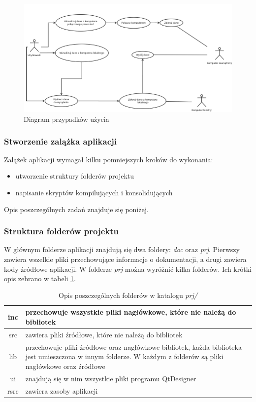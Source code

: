 \documentclass[a4paper]{article}
\begin{document}
\begin{figure}[h]
	\centering
	\includegraphics[width=0.75\paperheight, angle=90]{img/diagramPrzypadkowUzycia.png}
	\caption{Diagram przypadków użycia}
	\label{diagram_przypadkow_uzycia}
\end{figure}

\subsubsection{Stworzenie zalążka aplikacji}

Zalążek aplikacji wymagał kilku pomniejszych kroków do wykonania:
\begin{itemize}
	\item utworzenie struktury folderów projektu
	\item napisanie skryptów kompilujących i konsolidujących
\end{itemize}
Opis poszczególnych zadań znajduje się poniżej.

\subsubsection{Struktura folderów projektu}
W głównym folderze aplikacji znajdują się dwa foldery: \textit{doc} oraz \textit{prj}. Pierwszy zawiera wszelkie pliki przechowujące informacje o dokumentacji, a drugi zawiera kody źródłowe aplikacji. W folderze \textit{prj} można wyróżnić kilka folderów. Ich krótki opis zebrano w tabeli \ref{opis_folderow_prj}.

\begin{table}
\centering
\begin{tabularx}{0.7\linewidth}{|c|X|}
	\hline
	inc & przechowuje wszystkie pliki nagłówkowe, które nie należą do bibliotek \\ \hline
	src & zawiera pliki źródłowe, które nie należą do bibliotek \\ \hline
	lib & przechowuje pliki źródłowe oraz nagłówkowe bibliotek, każda biblioteka jest umieszczona 
		  w innym folderze. W każdym z folderów są pliki nagłówkowe oraz źródłowe \\ \hline
	ui & znajdują się w nim wszystkie pliki  programu QtDesigner \\ \hline
	rsrc  & zawiera zasoby aplikacji \\ \hline
\end{tabularx}
\caption{Opis poszczególnych folderów w katalogu \textit{prj/}}
\label{opis_folderow_prj}
\end{table}
\end{document}
